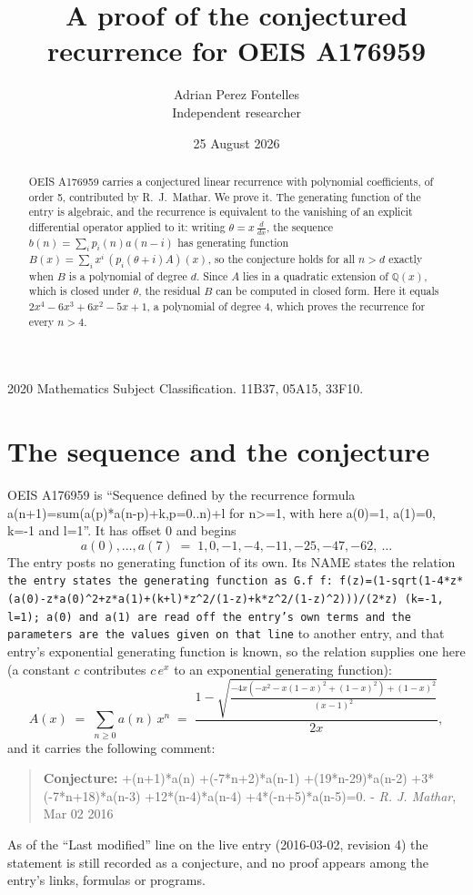\documentclass[11pt,a4paper]{article}
\title{A proof of the conjectured recurrence for OEIS A176959}
\author{Adrian Perez Fontelles\\ \small Independent researcher}
\date{25 August 2026}
\theoremstyle{plain}
\theoremstyle{definition}
\begin{document}
\maketitle

\begin{abstract}
OEIS A176959 carries a conjectured linear recurrence with polynomial coefficients, of
order 5, contributed by R.~J.~Mathar. We prove it. The generating function of the
entry is algebraic, and the recurrence is equivalent to the vanishing of an explicit
differential operator applied to it: writing $\theta=x\,\frac{d}{dx}$, the sequence
$b(n)=\sum_{i}p_{i}(n)a(n-i)$ has generating function
$B(x)=\sum_{i}x^{i}\,(p_{i}(\theta+i)A)(x)$, so the conjecture holds for all $n>d$ exactly
when $B$ is a polynomial of degree $d$. Since $A$ lies in a quadratic extension of
$\mathbb{Q}(x)$, which is closed under $\theta$, the residual $B$ can be computed in
closed form. Here it equals $2 x^{4} - 6 x^{3} + 6 x^{2} - 5 x + 1$, a polynomial of degree $4$, which proves
the recurrence for every $n>4$.
\end{abstract}

\noindent\small 2020 Mathematics Subject Classification. 11B37, 05A15, 33F10.\normalsize

\section{The sequence and the conjecture}

OEIS A176959 is ``Sequence defined by the recurrence formula a(n+1)=sum(a(p)*a(n-p)+k,p=0..n)+l for n>=1, with here a(0)=1, a(1)=0, k=-1 and l=1''. It has offset $0$ and begins
\[
a(0),\dots,a(7)\;=\;1, 0, -1, -4, -11, -25, -47, -62,\ \dots
\]
The entry posts no generating function of its own. Its NAME states the
relation \texttt{the entry states the generating function as G.f f: f(z)=(1-sqrt(1-4*z*(a(0)-z*a(0)\textasciicircum{}2+z*a(1)+(k+l)*z\textasciicircum{}2/(1-z)+k*z\textasciicircum{}2/(1-z)\textasciicircum{}2)))/(2*z) (k=-1, l=1); a(0) and a(1) are read off the entry's own terms and the parameters are the values given on that line} to another entry, and that entry's exponential generating
function is known, so the relation supplies one here (a constant $c$ contributes
$c\,e^{x}$ to an exponential generating function):
\begin{equation}\label{eq:gf}
A(x)\;=\;\sum_{n\ge 0} a(n)\,x^{n}\;=\;\frac{1 - \sqrt{\frac{- 4 x \left(- x^{2} - x \left(1 - x\right)^{2} + \left(1 - x\right)^{2}\right) + \left(1 - x\right)^{2}}{\left(x - 1\right)^{2}}}}{2 x} ,
\end{equation}
and it carries the following comment:
\begin{quote}\small
\textbf{Conjecture:} +(n+1)*a(n) +(-7*n+2)*a(n-1) +(19*n-29)*a(n-2) +3*(-7*n+18)*a(n-3) +12*(n-4)*a(n-4) +4*(-n+5)*a(n-5)=0. - \emph{R. J. Mathar}, Mar 02 2016
\end{quote}
As of the ``Last modified'' line on the live entry (2016-03-02, revision 4) the
statement is still recorded as a conjecture, and no proof appears among the entry's links,
formulas or programs.
\end{document}
